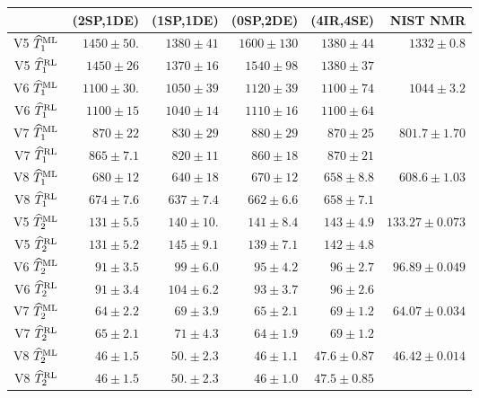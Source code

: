 \begin{table*} [t]
	\centering
	\begin{tabu} {c || r r r | r || r}
		\hline \hline
		 			& (2SP,1DE)			& (1SP,1DE) 		& (0SP,2DE)			& (4IR,4SE)			& NIST NMR\\
		\hline
		V5 $\widehat{T}_1^\mathrm{ML}$ 	& $1450 \pm 50.$	& $1380 \pm 41$ 	& $1600 \pm 130$	& $1380 \pm 44$		& $1332 \pm 0.8$ \\
		V5 $\widehat{T}_1^\mathrm{RL}$	& $1450 \pm 26$ 	& $1370 \pm 16$		& $1540 \pm 98$ 	& $1380 \pm 37$		& \\
		\hline
		V6 $\widehat{T}_1^\mathrm{ML}$ 	& $1100 \pm 30.$	& $1050 \pm 39$		& $1120 \pm 39$ 	& $1100 \pm 74$ 	& $1044 \pm 3.2$ \\
		V6 $\widehat{T}_1^\mathrm{RL}$ 	& $1100 \pm 15$ 	& $1040 \pm 14$ 	& $1110 \pm 16$ 	& $1100 \pm 64$ 	& \\
		\hline
		V7 $\widehat{T}_1^\mathrm{ML}$ 	& $870 \pm 22$ 		& $830 \pm 29$ 		& $880 \pm 29$		& $870 \pm 25$		& $801.7 \pm 1.70$ \\
		V7 $\widehat{T}_1^\mathrm{RL}$ 	& $865 \pm 7.1$ 	& $820 \pm 11$		& $860 \pm 18$		& $870 \pm 21$		& \\
		\hline
		V8 $\widehat{T}_1^\mathrm{ML}$ 	& $680 \pm 12$ 		& $640 \pm 18$		& $670 \pm 12$ 		& $658 \pm 8.8$ 	& $608.6 \pm 1.03$ \\
		V8 $\widehat{T}_1^\mathrm{RL}$ 	& $674 \pm 7.6$		& $637 \pm 7.4$ 	& $662 \pm 6.6$		& $658 \pm 7.1$		& \\
		\hline \hline
		V5 $\widehat{T}_2^\mathrm{ML}$ 	& $131 \pm 5.5$		& $140 \pm 10.$		& $141 \pm 8.4$		& $143 \pm 4.9$		& $133.27 \pm 0.073$ \\
		V5 $\widehat{T}_2^\mathrm{RL}$ 	& $131 \pm 5.2$ 	& $145 \pm 9.1$		& $139 \pm 7.1$		& $142 \pm 4.8$ 	& \\
		\hline
		V6 $\widehat{T}_2^\mathrm{ML}$	& $91 \pm 3.5$ 		& $99 \pm 6.0$ 		& $95 \pm 4.2$ 		& $96 \pm 2.7$ 		& $96.89 \pm 0.049$ \\
		V6 $\widehat{T}_2^\mathrm{RL}$ 	& $91 \pm 3.4$ 		& $104 \pm 6.2$		& $93 \pm 3.7$ 		& $96 \pm 2.6$		& \\
		\hline
		V7 $\widehat{T}_2^\mathrm{ML}$ 	& $64 \pm 2.2$		& $69 \pm 3.9$		& $65 \pm 2.1$ 		& $69 \pm 1.2$ 		& $64.07 \pm 0.034$ \\
		V7 $\widehat{T}_2^\mathrm{RL}$ 	& $65 \pm 2.1$ 		& $71 \pm 4.3$		& $64 \pm 1.9$ 		& $69 \pm 1.2$ 		& \\
		\hline
		V8 $\widehat{T}_2^\mathrm{ML}$	& $46 \pm 1.5$ 		& $50. \pm 2.3$ 	& $46 \pm 1.1$		& $47.6 \pm 0.87$ 	& $46.42 \pm 0.014$ \\
		V8 $\widehat{T}_2^\mathrm{RL}$	& $46 \pm 1.5$ 		& $50. \pm 2.3$ 	& $46 \pm 1.0$ 		& $47.5 \pm 0.85$ 	& \\	
		\hline \hline	 
	\end{tabu}

\end{table*}

